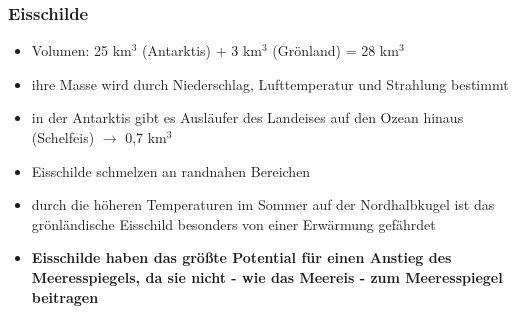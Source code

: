 \begin{frame}
	\frametitle{Eisschilde}
	\begin{itemize}
		\item Volumen: 25 km$^3$ (Antarktis) + 3 km$^3$ (Grönland) = 28 km$^3$
		\item ihre Masse wird durch Niederschlag, Lufttemperatur und Strahlung bestimmt
		\item in der Antarktis gibt es Ausläufer des Landeises auf den Ozean hinaus (Schelfeis) $\rightarrow$ 0,7 km$^3$
		\item Eisschilde schmelzen an randnahen Bereichen
		\item durch die höheren Temperaturen im Sommer auf der Nordhalbkugel ist das grönländische Eisschild besonders von einer Erwärmung gefährdet
		\item \textbf{Eisschilde haben das größte Potential für einen Anstieg des Meeresspiegels, da sie nicht - wie das Meereis - zum Meeresspiegel beitragen}
	\end{itemize}

\end{frame}

